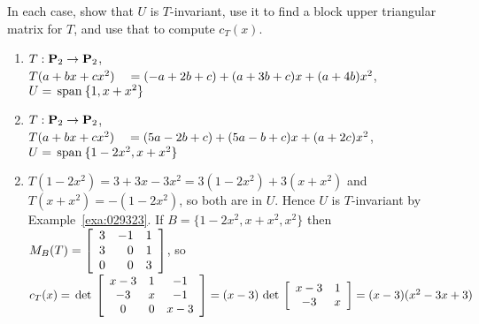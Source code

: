\begin{multicols}{2}
\columnbreak 

\begin{ex}
In each case, show that $U$ is $T$-invariant, use it to find a block upper triangular matrix for $T$, and use that to compute $c_{T}(x)$.


\begin{enumerate}[label={\alph*.}]
\item $T : \textbf{P}_2 \to \textbf{P}_2$, \\ $T(a + bx + cx^2) \\ \hspace*{1em}= (-a + 2b + c) + (a + 3b +c)x + (a + 4b)x^2$, \\ $U = \thinspace\operatorname{span \medspace}\{1, x + x^2\}$

\item $T : \textbf{P}_2 \to \textbf{P}_2$, \\ $T(a + bx + cx^2) \\ \hspace*{1em} = (5a - 2b + c) + (5a - b + c)x + (a + 2c)x^2$, \\$U = \thinspace\operatorname{span \medspace}\{1 - 2x^2, x + x^2\}$

\end{enumerate}
\begin{sol}
\begin{enumerate}[label={\alph*.}]
\setcounter{enumi}{1}
\item $T(1 - 2x^{2}) = 3 + 3x - 3x^{2} = 3(1 - 2x^{2}) + 3(x + x^{2})$ and $T(x + x^{2}) = -(1 - 2x^{2})$, so both are in $U$. Hence $U$ is $T$-invariant by Example~\ref{exa:029323}. If $B = \{ 1 - 2x^2, x + x^2, x^2 \}$ then $M_B(T) = \left[ \begin{array}{rrr} 3 & -1 & 1 \\ 3 & 0 & 1 \\ 0 & 0 & 3 \end{array} \right]$, so $c_T(x) = \thinspace\operatorname{det \medspace} \left[ \begin{array}{ccc} x - 3 & 1 & -1 \\ -3 & x & -1 \\ 0 & 0 & x - 3 \end{array} \right] = (x - 3) \thinspace\operatorname{det \medspace} \left[ \begin{array}{cc} x - 3 & 1 \\ -3 & x \end{array} \right] = (x - 3)(x^2 -3x + 3)$
\end{enumerate}
\end{sol}
\end{ex}


\end{multicols}

